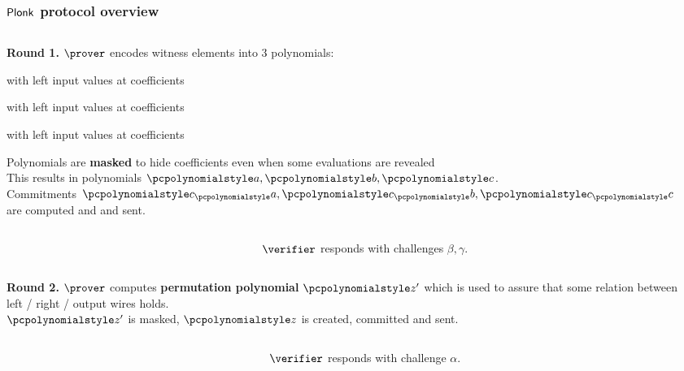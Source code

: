 \documentclass[aspectratio=169,handout]{beamer}
\renewcommand{\emph}[1]{\textbf{#1}}
\begin{document}
\begin{frame}
  \frametitle{$\textnormal{\textsf{Plonk}}$ protocol overview}
  \begin{columns}
    \begin{column}{0.5\linewidth}
      \textbf{Round 1.} $\prover$ encodes witness elements into $3$ polynomials:
      \begin{compactitem}
      \item {} with left input values at coefficients
      \item {} with left input values at coefficients
      \item {} with left input values at coefficients
      \end{compactitem}
      Polynomials are \emph{masked} to hide coefficients even when some
      evaluations are revealed\\
      This results in polynomials $\p{a}, \p{b}, \p{c}$. \\
      Commitments $\cp{a}, \cp{b}, \cp{c}$ are computed and and sent.
  \end{column}
  \begin{column}{0.5\linewidth}
    \end{column}
  \end{columns}
  \begin{columns}
    \begin{column}{0.5\linewidth}
    \end{column}
    \begin{column}{0.5\linewidth}
      $\verifier$ responds with challenges $\beta, \gamma$.
    \end{column}
  \end{columns}
    \begin{columns}
    \begin{column}{0.5\linewidth}
      \textbf{Round 2.} $\prover$ computes \emph{permutation polynomial}
      $\p{z'}$ which is used to assure that some relation between left / right /
      output wires holds.\\
      $\p{z'}$ is masked, $\p{z}$ is created, committed and sent.
    \end{column}
    \begin{column}{0.5\linewidth}
    \end{column}
  \end{columns}
      \begin{columns}
      \begin{column}{0.5\linewidth}
    \end{column}
    \begin{column}{0.5\linewidth}
      $\verifier$ responds with challenge $\alpha$.
    \end{column}
  \end{columns}


\end{frame}
\end{document}
